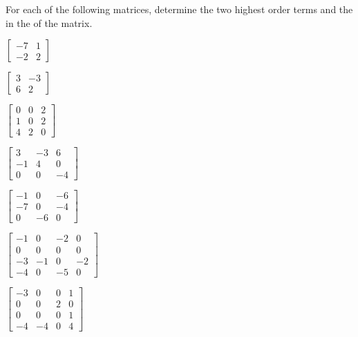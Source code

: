 \begin{exercise} \label{ex:} 
For each of the following matrices, determine the two highest order terms and the  in the  of the matrix.
\begin{parts}
\item \(\begin{bmatrix} -7 & 1
\\-2 & 2 \end{bmatrix}\)

\item \(\begin{bmatrix} 3 & -3
\\6 & 2 \end{bmatrix}\)

\item \(\begin{bmatrix} 0 & 0 & 2
\\1 & 0 & 2
\\4 & 2 & 0 \end{bmatrix}\)

\item \(\begin{bmatrix} 3 & -3 & 6
\\-1 & 4 & 0
\\0 & 0 & -4 \end{bmatrix}\)

\item \(\begin{bmatrix} -1 & 0 & -6
\\-7 & 0 & -4
\\0 & -6 & 0 \end{bmatrix}\)

\item \(\begin{bmatrix} -1 & 0 & -2 & 0
\\0 & 0 & 0 & 0
\\-3 & -1 & 0 & -2
\\-4 & 0 & -5 & 0 \end{bmatrix}\)

\item \(\begin{bmatrix} -3 & 0 & 0 & 1
\\0 & 0 & 2 & 0
\\0 & 0 & 0 & 1
\\-4 & -4 & 0 & 4 \end{bmatrix}\)


\end{parts}
\end{exercise}
